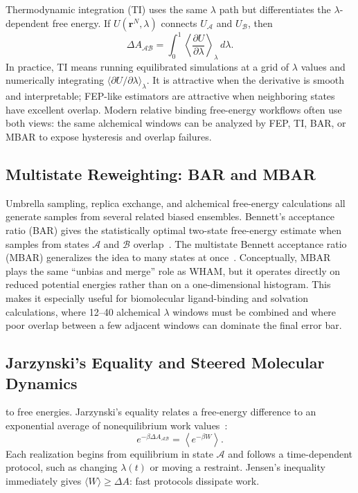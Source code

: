 Thermodynamic integration (TI) uses the same $\lambda$ path but differentiates the $\lambda$-dependent free energy. If $U(\mathbf{r}^N,\lambda)$ connects $U_{\mathcal{A}}$ and $U_{\mathcal{B}}$, then~\cite{kirkwood1935,tuckerman2023}
\begin{equation}
\label{eq:ti-kirkwood}
\Delta A_{\mathcal{A}\mathcal{B}}
= \int_0^1
\left\langle \frac{\partial U}{\partial \lambda} \right\rangle_\lambda
\, d\lambda .
\end{equation}
In practice, TI means running equilibrated simulations at a grid of $\lambda$ values and numerically integrating $\langle \partial U/\partial\lambda\rangle_\lambda$. It is attractive when the derivative is smooth and interpretable; FEP-like estimators are attractive when neighboring states have excellent overlap. Modern relative binding free-energy workflows often use both views: the same alchemical windows can be analyzed by FEP, TI, BAR, or MBAR to expose hysteresis and overlap failures.

\subsection{Multistate Reweighting: BAR and MBAR}
\label{sec:mbar}

Umbrella sampling, replica exchange, and alchemical free-energy calculations all generate samples from several related biased ensembles. Bennett's acceptance ratio (BAR) gives the statistically optimal two-state free-energy estimate when samples from states $\mathcal{A}$ and $\mathcal{B}$ overlap~\cite{bennett1976}. The multistate Bennett acceptance ratio (MBAR) generalizes the idea to many states at once~\cite{shirts2008}. Conceptually, MBAR plays the same ``unbias and merge'' role as WHAM, but it operates directly on reduced potential energies rather than on a one-dimensional histogram. This makes it especially useful for biomolecular ligand-binding and solvation calculations, where 12--40 alchemical $\lambda$ windows must be combined and where poor overlap between a few adjacent windows can dominate the final error bar.

\subsection{Jarzynski's Equality and Steered Molecular Dynamics}
\label{sec:jarzynski-steered}

 to free energies. Jarzynski's equality relates a free-energy difference to an exponential average of nonequilibrium work values~\cite{jarzynski1997,tuckerman2023}:
\begin{equation}
\label{eq:jarzynski}
e^{-\beta \Delta A_{\mathcal{A}\mathcal{B}}}
= \left\langle e^{-\beta W} \right\rangle .
\end{equation}
Each realization begins from equilibrium in state $\mathcal{A}$ and follows a time-dependent protocol, such as changing $\lambda(t)$ or moving a restraint. Jensen's inequality immediately gives $\langle W\rangle \ge \Delta A$: fast protocols dissipate work.

